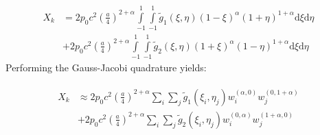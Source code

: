 \documentclass[12pt,letterpaper]{article}
\theoremstyle{definition}
\numberwithin{equation}{subsection}
\newcommand{\dd}{\text{d}}
\begin{document}
\begin{align*}
    X_{k} &= 2 p_0 c^2 \left(\frac{a}{4}\right)^{2+\alpha} \int\limits_{-1}^1\int\limits_{-1}^1 \tilde g_1(\xi, \eta) (1-\xi)^{\alpha} (1 + \eta)^{1+\alpha}\dd \xi \dd \eta \\
    &+ 2 p_0 c^2 \left(\frac{a}{4}\right)^{2+\alpha} \int\limits_{-1}^1\int\limits_{-1}^1 \tilde g_2(\xi, \eta) (1+\xi)^{\alpha} (1 - \eta)^{1+\alpha}\dd \xi \dd \eta
\end{align*}
Performing the Gauss-Jacobi quadrature yields:

\begin{align}
\begin{split}
    X_k &\approx 2 p_0 c^2 \left(\frac{a}{4}\right)^{2+\alpha} \sum_i \sum_j \tilde g_1(\xi_i, \eta_j) w_i^{(\alpha,0)}w_j^{(0,1+\alpha)}\\
    &+ 2 p_0 c^2 \left(\frac{a}{4}\right)^{2+\alpha} \sum_i \sum_j \tilde g_2(\xi_i, \eta_j) w_i^{(0,\alpha)}w_j^{(1+\alpha, 0)}
\end{split}
\end{align}
\end{document}
